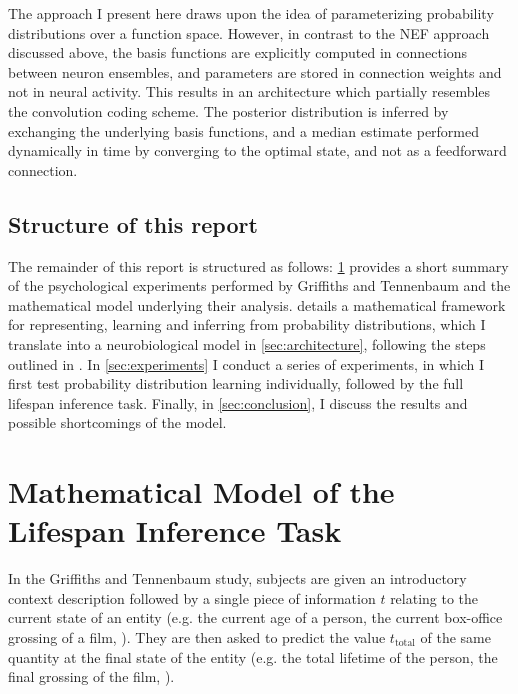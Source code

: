 \documentclass[a4paper,11pt]{article}
\begin{document}
The approach I present here draws upon the idea of parameterizing probability distributions over a function space. However, in contrast to the NEF approach discussed above, the basis functions are explicitly computed in connections between neuron ensembles, and parameters are stored in connection weights and not in neural activity. This results in an architecture which partially resembles the convolution coding scheme. The posterior distribution is inferred by exchanging the underlying basis functions, and a median estimate  performed dynamically in time by converging to the optimal state, and not as a feedforward connection.

\subsection{Structure of this report}

The remainder of this report is structured as follows: \cref{sec:lifespan_inference_task} provides a short summary of the psychological experiments performed by Griffiths and Tennenbaum and the mathematical model underlying their analysis.  details a mathematical framework for representing, learning and inferring from probability distributions, which I translate into a neurobiological model in \cref{sec:architecture}, following the steps outlined in \cite{eliasmith2003neural}. In \cref{sec:experiments} I conduct a series of experiments, in which I first test probability distribution learning individually, followed by the full lifespan inference task. Finally, in \cref{sec:conclusion}, I discuss the results and possible shortcomings of the model.

\pagebreak
\section{Mathematical Model of the Lifespan Inference Task}
\label{sec:lifespan_inference_task}

In the Griffiths and Tennenbaum study, subjects are given an introductory context description followed by a single piece of information $t$ relating to the current state of an entity (e.g\@. the current age of a person, the current box-office grossing of a film, \textellipsis). They are then asked to predict the value $t_\mathrm{total}$ of the same quantity at the final state of the entity (e.g\@. the total lifetime of the person, the final grossing of the film, \textellipsis).
\end{document}
